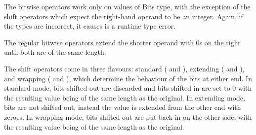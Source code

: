 \begin{prooftree}
\end{prooftree}

\begin{prooftree}
\end{prooftree}

\begin{prooftree}
\end{prooftree}

\FloatBarrier

The bitwise operators work only on values of Bits type, with the exception
of the shift operators which expect the right-hand operand to be an integer.
Again, if the types are incorrect, it causes is a runtime type error.

The regular bitwise operators extend the shorter operand with 0s on the right
until both are of the same length.

The shift operators come in three flavours: standard (\op{\textasciitilde>}
and \op{<\textasciitilde}), extending (\op{\textasciitilde\textasciitilde>}
and \op{<\textasciitilde\textasciitilde}), and wrapping (\op{>\textasciitilde>}
and \op{<\textasciitilde<}), which determine the behaviour of the bits at either end.
In standard mode, bits shifted out are discarded and bits shifted in are set to 0
with the resulting value being of the same length as the original.
In extending mode, bits are not shifted out, instead the value is extended from the
other end with zeroes. In wrapping mode, bits shifted out are put back in on the
other side, with the resulting value being of the same length as the original.

\begin{prooftree}
\end{prooftree}

\begin{prooftree}
\end{prooftree}

